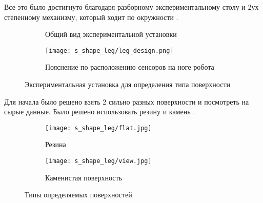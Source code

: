 Все это было достигнуто благодаря разборному экспериментальному столу и 2ух степенному механизму, который ходит по окружности .

\begin{figure}[H]
    \begin{subfigure}[t]{0.49\textwidth}
        \centering
        \caption{Общий вид экспериментальной установки}
        \label{fig:s_shape_leg/s_leg_setup.JPG}
    \end{subfigure}
    \begin{subfigure}[t]{0.49\textwidth}
        \centering\texttt{[image: s\_shape\_leg/leg\_design.png]}
        \caption{Пояснение по расположению сенсоров на ноге робота}
        \label{fig:s_shape_leg/leg_design.png}
    \end{subfigure}
    \caption{Экспериментальная установка для определения типа поверхности}
\end{figure}

Для начала было решено взять 2 сильно разных поверхности и посмотреть на сырые данные. Было решено использовать резину  и камень .

\begin{figure}[H]
    \begin{subfigure}[t]{0.49\textwidth}
        \centering\texttt{[image: s\_shape\_leg/flat.jpg]}
        \caption{Резина}
        \label{fig:s_shape_leg/flat.jpg}
    \end{subfigure}
    \hfill
    \begin{subfigure}[t]{0.49\textwidth}
        \centering\texttt{[image: s\_shape\_leg/view.jpg]}
        \caption{Каменистая поверхность}
        \label{fig:s_shape_leg/view.jpg}
    \end{subfigure}
    \caption{Типы определяемых поверхностей}
\end{figure}

